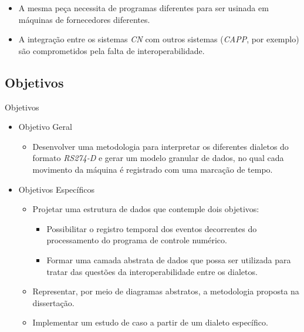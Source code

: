 \documentclass[aspectratio=169]{beamer}
\begin{document}
{\begin{frame}
\begin{itemize}
    \item {
      A mesma pe\c ca necessita de programas diferentes para ser usinada 
      em m\'aquinas de fornecedores diferentes.
    }

    \item {
      A integração entre os sistemas \emph{CN} com outros sistemas 
      (\emph{CAPP}, por exemplo) são comprometidos pela falta de 
      interoperabilidade.
    }

  \end{itemize} 

\end{frame}


\subsection{Objetivos}

\begin{frame}{Objetivos}

  \begin{itemize}

    \item Objetivo Geral
      \begin{itemize}
        \item { 
          Desenvolver uma metodologia para interpretar os diferentes dialetos 
          do formato \emph{RS274-D} e gerar um modelo granular de dados, 
          no qual cada movimento da m\'aquina \'e registrado com uma marcação 
          de tempo.
        }
      \end{itemize}
    \vspace{3mm}
    \item Objetivos Específicos
      \begin{itemize}
        \item Projetar uma estrutura de dados que contemple dois objetivos:
        \begin{itemize}
            \item Possibilitar o registro temporal dos eventos decorrentes do 
                  processamento do programa de controle numérico.
            \item Formar uma camada abstrata de dados que possa ser utilizada
                  para tratar das questões da interoperabilidade entre os 
                  dialetos.
        \end{itemize}
        \item Representar, por meio de diagramas abstratos, a metodologia proposta na dissertação.
        \item Implementar um estudo de caso a partir de um dialeto específico.
    \end{itemize}


\end{itemize}
\end{frame}}
\end{document}
